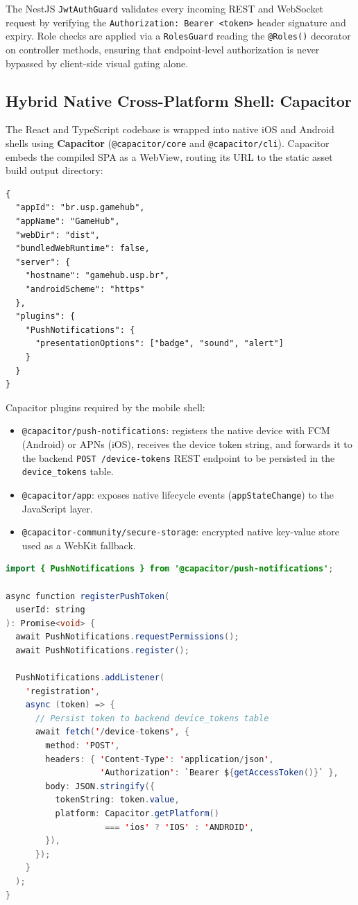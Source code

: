 \documentclass[11pt,a4paper]{report}
\begin{document}
The NestJS \texttt{JwtAuthGuard} validates every incoming REST and WebSocket request by verifying the \texttt{Authorization: Bearer <token>} header signature and expiry. Role checks are applied via a \texttt{RolesGuard} reading the \texttt{@Roles()} decorator on controller methods, ensuring that endpoint-level authorization is never bypassed by client-side visual gating alone.

\subsection{Hybrid Native Cross-Platform Shell: Capacitor}

The React and TypeScript codebase is wrapped into native iOS and Android shells using \textbf{Capacitor} (\texttt{@capacitor/core} and \texttt{@capacitor/cli}). Capacitor embeds the compiled SPA as a WebView, routing its URL to the static asset build output directory:

\begin{lstlisting}[caption={capacitor.config.json -- SPA asset routing}]
{
  "appId": "br.usp.gamehub",
  "appName": "GameHub",
  "webDir": "dist",
  "bundledWebRuntime": false,
  "server": {
    "hostname": "gamehub.usp.br",
    "androidScheme": "https"
  },
  "plugins": {
    "PushNotifications": {
      "presentationOptions": ["badge", "sound", "alert"]
    }
  }
}
\end{lstlisting}

Capacitor plugins required by the mobile shell:
\begin{itemize}
  \item \texttt{@capacitor/push-notifications}: registers the native device with FCM (Android) or APNs (iOS), receives the device token string, and forwards it to the backend \texttt{POST /device-tokens} REST endpoint to be persisted in the \texttt{device\_tokens} table.
  \item \texttt{@capacitor/app}: exposes native lifecycle events (\texttt{appStateChange}) to the JavaScript layer.
  \item \texttt{@capacitor-community/secure-storage}: encrypted native key-value store used as a WebKit fallback.
\end{itemize}

\begin{lstlisting}[language=Java, caption={Push token registration via @capacitor/push-notifications}]
import { PushNotifications } from '@capacitor/push-notifications';

async function registerPushToken(
  userId: string
): Promise<void> {
  await PushNotifications.requestPermissions();
  await PushNotifications.register();

  PushNotifications.addListener(
    'registration',
    async (token) => {
      // Persist token to backend device_tokens table
      await fetch('/device-tokens', {
        method: 'POST',
        headers: { 'Content-Type': 'application/json',
                   'Authorization': `Bearer ${getAccessToken()}` },
        body: JSON.stringify({
          tokenString: token.value,
          platform: Capacitor.getPlatform()
                    === 'ios' ? 'IOS' : 'ANDROID',
        }),
      });
    }
  );
}
\end{lstlisting}
\end{document}
